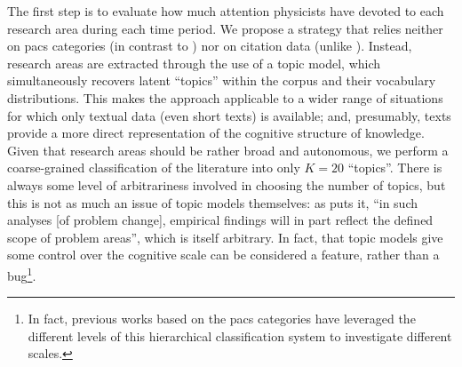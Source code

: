 \documentclass{article}
\begin{document}
The first step is to evaluate how much attention physicists have devoted to each research area during each time period. We propose a strategy that relies neither on \gls{pacs} categories (in contrast to \citealt{Jia2017,Battiston2019,Aleta2019,Tripodi2020}) nor on citation data (unlike \citealt{Zeng2019}). Instead, research areas are extracted through the use of a topic model, which simultaneously recovers latent ``topics'' within the corpus and their vocabulary distributions. This makes the approach applicable to a wider range of situations for which only textual data (even short texts) is available; and, presumably, texts provide a more direct representation of the cognitive structure of knowledge. Given that research areas should be rather broad and autonomous, we perform a coarse-grained classification of the literature into only $K=20$ ``topics''. There is always some level of arbitrariness involved in choosing the number of topics, but this is not as much an issue of topic models themselves: as \citet{Gieryn1978} puts it, ``in such analyses [of problem change], empirical findings will in part reflect the defined scope of problem areas'', which is itself arbitrary. In fact, that topic models give some control over the cognitive scale can be considered a feature, rather than a bug\footnote{In fact, previous works based on the \gls{pacs} categories have leveraged the different levels of this hierarchical classification system to investigate different scales.}.
\end{document}
